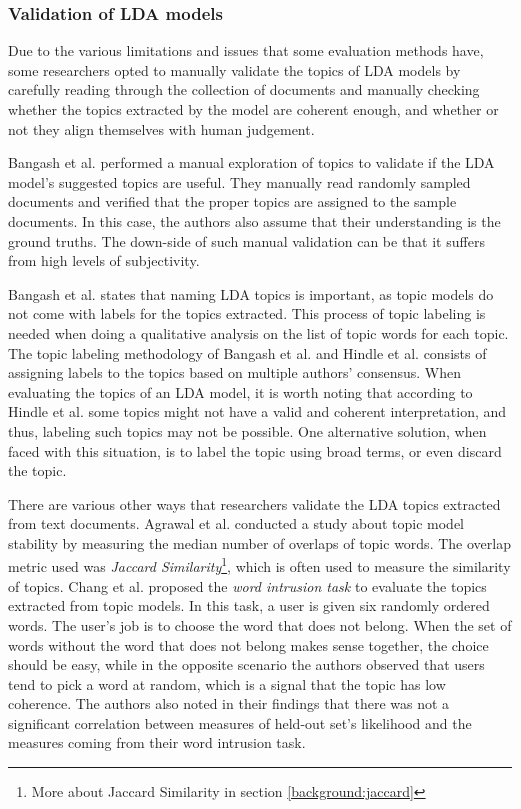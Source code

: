        \subsubsection{Validation of LDA models}
            Due to the various limitations and issues that some evaluation methods have, some researchers opted to manually validate the topics of LDA models by carefully reading through the collection of documents and manually checking whether the topics extracted by the model are coherent enough, and whether or not they align themselves with human judgement. 
            
            Bangash et al. \cite{bangash2019developers} performed a manual exploration of topics to validate if the LDA model's suggested topics are useful. They manually read randomly sampled documents and verified that the proper topics are assigned to the sample documents. In this case, the authors also assume that their understanding is the ground truths. The down-side of such manual validation can be that it suffers from high levels of subjectivity.
             
            \label{topicLabeling} Bangash et al. \cite{bangash2019developers} states that naming LDA topics is important, as topic models do not come with labels for the topics extracted. This process of topic labeling is needed when doing a qualitative analysis on the list of topic words for each topic. The topic labeling methodology of Bangash et al. \cite{bangash2019developers} and Hindle et al. \cite{hindle2012relating} consists of assigning labels to the topics based on multiple authors' consensus. When evaluating the topics of an LDA model, it is worth noting that according to Hindle et al. \cite{hindle2012relating} some topics might not have a valid and coherent interpretation, and thus, labeling such topics may not be possible. One alternative solution, when faced with this situation, is to label the topic using broad terms, or even discard the topic.
            
            There are various other ways that researchers validate the LDA topics extracted from text documents. Agrawal et al. \cite{agrawal2018wrong} conducted a study about topic model stability by measuring the median number of overlaps of topic words. The overlap metric used was \emph{Jaccard Similarity}\footnote{More about Jaccard Similarity in section \ref{background:jaccard}}, which is often used to measure the similarity of topics. Chang et al. \cite{chang2009reading} proposed the \emph{word intrusion task} to evaluate the topics extracted from topic models. In this task, a user is given six randomly ordered words. The user's job is to choose the word that does not belong. When the set of words without the word that does not belong makes sense together, the choice should be easy, while in the opposite scenario the authors observed that users tend to pick a word at random, which is a signal that the topic has low coherence. The authors also noted in their findings that there was not a significant correlation between measures of held-out set's likelihood and the measures coming from their word intrusion task.
        
